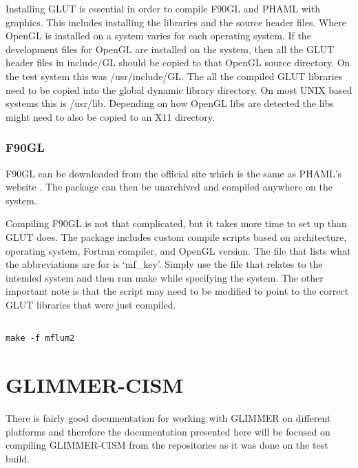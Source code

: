 Installing GLUT is essential in order to compile F90GL and PHAML with graphics.  This includes installing the libraries and the source header files.  Where OpenGL is installed on a system varies for each operating system.  If the development files for OpenGL are installed on the system, then all the GLUT header files in include/GL should be copied to that OpenGL source directory.  On the test system this was /usr/include/GL.  The all the compiled GLUT libraries need to be copied into the global dynamic library directory.  On most UNIX based systems this is /usr/lib.  Depending on how OpenGL libs are detected the libs might need to also be copied to an X11 directory.


\subsubsection{F90GL}
F90GL can be downloaded from the official site which is the same as PHAML's website \cite{PHAML:website}.  The package can then be unarchived and compiled anywhere on the system.

Compiling F90GL is not that complicated, but it takes more time to set up than GLUT does.  The package includes custom compile scripts based on architecture, operating system, Fortran compiler, and OpenGL version.  The file that lists what the abbreviations are for is `mf\_key'.  Simply use the file that relates to the intended system and then run make while specifying the system.  The other important note is that the script may need to be modified to point to the correct GLUT libraries that were just compiled.  

\begin{framecode}{6in}
\begin{verbatim}

make -f mflum2

\end{verbatim}
\end{framecode}

\section{GLIMMER-CISM}

There is fairly good documentation for working with GLIMMER on different platforms and therefore the documentation presented here will be focused on compiling GLIMMER-CISM from the repositories as it was done on the test build.

